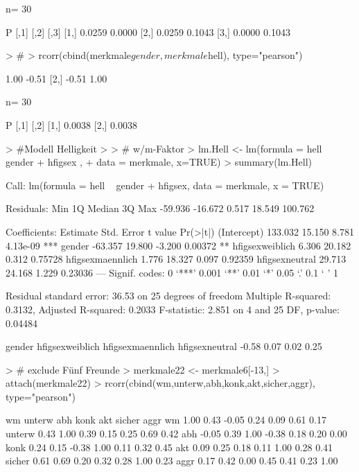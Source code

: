 \begin{Schunk}
\begin{Soutput}
n= 30 


P
     [,1]   [,2]   [,3]  
[1,]        0.0259 0.0000
[2,] 0.0259        0.1043
[3,] 0.0000 0.1043       
\end{Soutput}
\begin{Sinput}
> # 
> rcorr(cbind(merkmale$gender,merkmale$hell), type="pearson")
\end{Sinput}
\begin{Soutput}
      [,1]  [,2]
[1,]  1.00 -0.51
[2,] -0.51  1.00

n= 30 


P
     [,1]   [,2]  
[1,]        0.0038
[2,] 0.0038       
\end{Soutput}
\begin{Sinput}
> #Modell Helligkeit
> 
> # w/m-Faktor
> lm.Hell <- lm(formula = hell ~ gender + hfigsex  , 
+   data = merkmale, x=TRUE)
> summary(lm.Hell)
\end{Sinput}
\begin{Soutput}
Call:
lm(formula = hell ~ gender + hfigsex, data = merkmale, x = TRUE)

Residuals:
    Min      1Q  Median      3Q     Max 
-59.936 -16.672   0.517  18.549 100.762 

Coefficients:
                 Estimate Std. Error t value Pr(>|t|)    
(Intercept)       133.032     15.150   8.781 4.13e-09 ***
gender            -63.357     19.800  -3.200  0.00372 ** 
hfigsexweiblich     6.306     20.182   0.312  0.75728    
hfigsexmaennlich    1.776     18.327   0.097  0.92359    
hfigsexneutral     29.713     24.168   1.229  0.23036    
---
Signif. codes:  0 ‘***’ 0.001 ‘**’ 0.01 ‘*’ 0.05 ‘.’ 0.1 ‘ ’ 1 

Residual standard error: 36.53 on 25 degrees of freedom
Multiple R-squared: 0.3132,	Adjusted R-squared: 0.2033 
F-statistic: 2.851 on 4 and 25 DF,  p-value: 0.04484 
\end{Soutput}
\begin{Soutput}
          gender  hfigsexweiblich hfigsexmaennlich   hfigsexneutral 
           -0.58             0.07             0.02             0.25 
\end{Soutput}
\begin{Sinput}
> # exclude Fünf Freunde
> merkmale22 <- merkmale6[-13,]
> attach(merkmale22)
> rcorr(cbind(wm,unterw,abh,konk,akt,sicher,aggr), type="pearson")
\end{Sinput}
\begin{Soutput}
          wm unterw   abh  konk  akt sicher aggr
wm      1.00   0.43 -0.05  0.24 0.09   0.61 0.17
unterw  0.43   1.00  0.39  0.15 0.25   0.69 0.42
abh    -0.05   0.39  1.00 -0.38 0.18   0.20 0.00
konk    0.24   0.15 -0.38  1.00 0.11   0.32 0.45
akt     0.09   0.25  0.18  0.11 1.00   0.28 0.41
sicher  0.61   0.69  0.20  0.32 0.28   1.00 0.23
aggr    0.17   0.42  0.00  0.45 0.41   0.23 1.00


\end{Soutput}
\end{Schunk}
